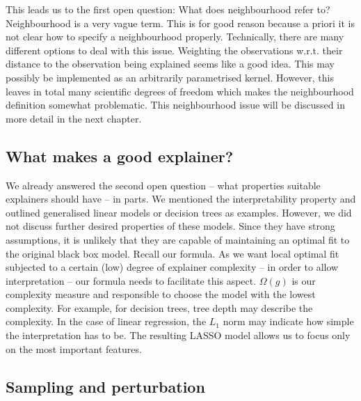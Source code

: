 \documentclass[
]{krantz}
\begin{document}
This leads us to the first open question:
What does neighbourhood refer to?
Neighbourhood is a very vague term.
This is for good reason because a priori it is not clear how to specify a neighbourhood properly.
Technically, there are many different options to deal with this issue.
Weighting the observations w.r.t. their distance to the observation being explained seems like a good idea.
This may possibly be implemented as an arbitrarily parametrised kernel.
However, this leaves in total many scientific degrees of freedom which makes the neighbourhood definition somewhat problematic.
This neighbourhood issue will be discussed in more detail in the next chapter.

\hypertarget{what-makes-a-good-explainer}{%
\subsection{What makes a good explainer?}\label{what-makes-a-good-explainer}}

We already answered the second open question -- what properties suitable explainers should have -- in parts.
We mentioned the interpretability property and outlined generalised linear models or decision trees as examples.
However, we did not discuss further desired properties of these models.
Since they have strong assumptions, it is unlikely that they are capable of maintaining an optimal fit to the original black box model.
Recall our formula.
As we want local optimal fit subjected to a certain (low) degree of explainer complexity -- in order to allow interpretation -- our formula needs to facilitate this aspect.
\(\Omega\left(g\right)\) is our complexity measure and responsible to choose the model with the lowest complexity.
For example, for decision trees, tree depth may describe the complexity.
In the case of linear regression, the \(L_1\) norm may indicate how simple the interpretation has to be.
The resulting LASSO model allows us to focus only on the most important features.

\hypertarget{sampling-and-perturbation}{%
\subsection{Sampling and perturbation}\label{sampling-and-perturbation}}
\end{document}
